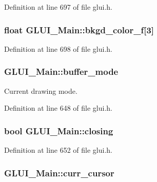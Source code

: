 Definition at line 697 of file glui.\+h.

\hypertarget{class_g_l_u_i___main_a703f236c77d05226bf6ffd01c5c80d0d}{
\subsubsection[{bkgd\+\_\+color\+\_\+f}]{\setlength{\rightskip}{0pt plus 5cm}float G\+L\+U\+I\+\_\+\+Main\+::bkgd\+\_\+color\+\_\+f\mbox{[}3\mbox{]}}}\label{class_g_l_u_i___main_a703f236c77d05226bf6ffd01c5c80d0d}


Definition at line 698 of file glui.\+h.

\hypertarget{class_g_l_u_i___main_a4ba466d21144d6fd0c7984039523ad2f}{
\subsubsection[{buffer\+\_\+mode}]{ G\+L\+U\+I\+\_\+\+Main\+::buffer\+\_\+mode\hspace{0.3cm}{\ttfamily [protected]}}}\label{class_g_l_u_i___main_a4ba466d21144d6fd0c7984039523ad2f}


Current drawing mode. 



Definition at line 648 of file glui.\+h.

\hypertarget{class_g_l_u_i___main_a5392e305249f1baf91402460b7c14f10}{
\subsubsection[{closing}]{\setlength{\rightskip}{0pt plus 5cm}bool G\+L\+U\+I\+\_\+\+Main\+::closing\hspace{0.3cm}{\ttfamily [protected]}}}\label{class_g_l_u_i___main_a5392e305249f1baf91402460b7c14f10}


Definition at line 652 of file glui.\+h.

\hypertarget{class_g_l_u_i___main_a661d825dbff47caee733683f557491cf}{
\subsubsection[{curr\+\_\+cursor}]{ G\+L\+U\+I\+\_\+\+Main\+::curr\+\_\+cursor\hspace{0.3cm}{\ttfamily [protected]}}}\label{class_g_l_u_i___main_a661d825dbff47caee733683f557491cf}


